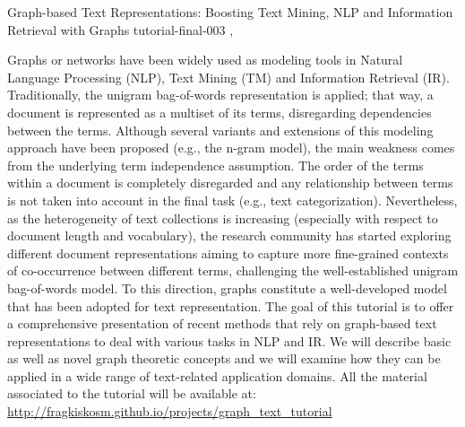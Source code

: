 \begin{tutorial}
  {Graph-based Text Representations: Boosting Text Mining, NLP and Information Retrieval with Graphs}
  {tutorial-final-003}
  {\daydateyear, \tutorialmorningtime}
  {\TutLocC}

Graphs or networks have been widely used as modeling tools in Natural Language Processing (NLP), Text Mining (TM) and Information Retrieval (IR). Traditionally, the unigram bag-of-words representation is applied; that way, a document is represented as a multiset of its terms, disregarding dependencies between the terms. Although several variants and extensions of this modeling approach have been proposed (e.g., the n-gram model), the main weakness comes from the underlying term independence assumption. The order of the terms within a document is completely disregarded and any relationship between terms is not taken into account in the final task (e.g., text categorization). Nevertheless, as the heterogeneity of text collections is increasing (especially with respect to document length and vocabulary), the research community has started exploring different document representations aiming to capture more fine-grained contexts of co-occurrence between different terms, challenging the well-established unigram bag-of-words model. To this direction, graphs constitute a well-developed model that has been adopted for text representation. The goal of this tutorial is to offer a comprehensive presentation of recent methods that rely on graph-based text representations to deal with various tasks in NLP and IR. We will describe basic as well as novel graph theoretic concepts and we will examine how they can be applied in a wide range of text-related application domains.
All the material associated to the tutorial will be available at: \url{http://fragkiskosm.github.io/projects/graph_text_tutorial}

\end{tutorial}
